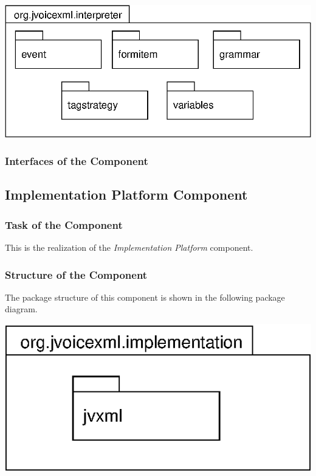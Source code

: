 \documentclass[11pt,a4paper]{article}
\begin{document}
\begin{center}
\includegraphics{package-org.jvoicexml.interpreter.eps}
\end{center}

\subsubsection{Interfaces of the Component}

\subsection{Implementation Platform Component}
\label{sec:impl-platf-comp}

\subsubsection{Task of the Component}

This is the realization of the \emph{Implementation Platform}
component.

\subsubsection{Structure of the Component}

The package structure of this component is shown in the following
package diagram.

\begin{center}
\includegraphics{package-org.jvoicexml.implementation.eps}
\end{center}
\end{document}
